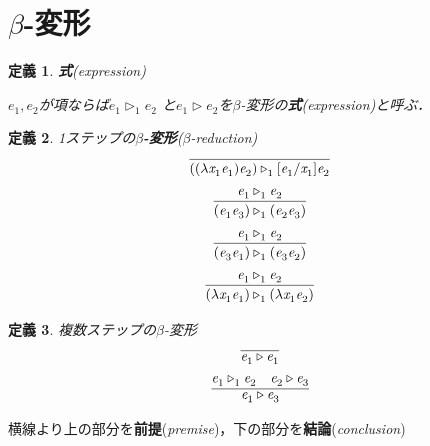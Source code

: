 \documentclass{ltjsbook}%
\newtheorem{definition}{定義}[section]%
\newcommand\term[2]{\textbf{#1}{(\textit{#2})}}%
\begin{document}
\section{$\beta$-変形}%
\label{sect:beta}%
\begin{definition}%
  \term{式}{expression}%
  \par$\mathit{e}_1^{},\mathit{e}_2^{}$が項ならば$\mathit{e}_1^{}\triangleright_1^{}\mathit{e}_2^{}$%
  と$\mathit{e}_1^{}\triangleright\mathit{e}_2^{}$を$\beta$-変形の\term{式}{expression}と呼ぶ．%
\end{definition}%
\begin{definition}%
1ステップの\term{$\beta$-変形}{$\beta$-reduction}%
\begin{equation}%
  \infer{%
    ((\lambda\mathit{x}_1^{}\mathit{e}_1^{})\mathit{e}_2^{})\triangleright_1^{}%
    [\mathit{e}_1^{}/\mathit{x}_1^{}]\mathit{e}_2^{}%
  }{%
  }%
\end{equation}%
\begin{equation}%
  \infer{%
    (\mathit{e}_1^{}\mathit{e}_3^{})\triangleright_1^{}(\mathit{e}_2^{}\mathit{e}_3^{})%
  }{%
    \mathit{e}_1^{}\triangleright_1^{}\mathit{e}_2^{}%
  }%
\end{equation}%
\begin{equation}%
  \infer{%
    (\mathit{e}_3^{}\mathit{e}_1^{})\triangleright_1^{}(\mathit{e}_3^{}\mathit{e}_2^{})%
  }{%
    \mathit{e}_1^{}\triangleright_1^{}\mathit{e}_2^{}%
  }%
\end{equation}%
\begin{equation}%
  \infer{%
    (\lambda\mathit{x}_1^{}\mathit{e}_1^{})\triangleright_1^{}%
    (\lambda\mathit{x}_1^{}\mathit{e}_2^{})%
  }{%
    \mathit{e}_1^{}\triangleright_1^{}\mathit{e}_2^{}%
  }%
\end{equation}%
\end{definition}%
\begin{definition}%
複数ステップの$\beta$-変形%
\begin{equation}%
  \infer{%
    \mathit{e}_1^{}\triangleright\mathit{e}_1^{}%
  }{%
  }%
\end{equation}%
\begin{equation}%
  \infer{%
    \mathit{e}_1^{}\triangleright\mathit{e}_3^{}%
  }{%
    \mathit{e}_1^{}\triangleright_1^{}\mathit{e}_2^{}%
  &%
    \mathit{e}_2^{}\triangleright\mathit{e}_3^{}%
  }%
\end{equation}%
\end{definition}%
\par 横線より上の部分を\term{前提}{premise}，下の部分を\term{結論}{conclusion}%
\end{document}
